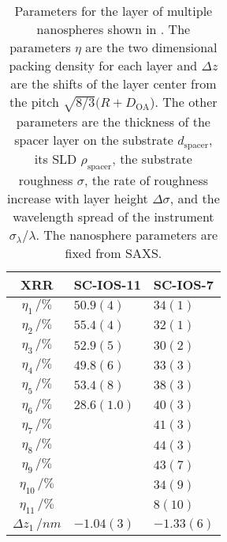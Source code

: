 \documentclass[\main/dresen_thesis.tex]{subfiles}
\begin{document}
  \begin{table}[!htbp]
    \centering
    \caption{\label{tab:looselyPackedNP:nanoparticle:xrr}Parameters for the layer of multiple nanospheres shown in . The parameters $\eta$ are the two dimensional packing density for each layer and $\Delta z$ are the shifts of the layer center from the pitch $\sqrt{8/3} (R+D_\mathrm{OA}$). The other parameters are the thickness of the spacer layer on the substrate $d_\mathrm{spacer}$, its SLD $\rho_\mathrm{spacer}$, the substrate roughness $\sigma$, the rate of roughness increase with layer height $\Delta \sigma$, and the wavelength spread of the instrument $\sigma_\lambda / \lambda$. The nanosphere parameters are fixed from SAXS.}
    \begin{tabular}{ c | l | l }
      \rule{0pt}{2ex} \textbf{XRR}  & \textbf{SC-IOS-11} & \textbf{SC-IOS-7} \\
      \hline
       $\eta_1     \, / \unit{\%}$                                  & $50.9(4)$         & $34(1)$    \\
       $\eta_2     \, / \unit{\%}$                                  & $55.4(4)$         & $32(1)$    \\
       $\eta_3     \, / \unit{\%}$                                  & $52.9(5)$         & $30(2)$    \\
       $\eta_4     \, / \unit{\%}$                                  & $49.8(6)$         & $33(3)$    \\
       $\eta_5     \, / \unit{\%}$                                  & $53.4(8)$         & $38(3)$    \\
       $\eta_6     \, / \unit{\%}$                                  & $28.6(1.0)$       & $40(3)$    \\
       $\eta_7     \, / \unit{\%}$                                  &                   & $41(3)$    \\
       $\eta_8     \, / \unit{\%}$                                  &                   & $44(3)$    \\
       $\eta_9     \, / \unit{\%}$                                  &                   & $43(7)$    \\
       $\eta_{10}     \, / \unit{\%}$                               &                   & $34(9)$    \\
       $\eta_{11}     \, / \unit{\%}$                               &                   & $8(10)$    \\
       \hline
       $\Delta z_1 \, / \unit{nm} $                                 & $-1.04(3)$        & $-1.33(6)$ \\

\end{tabular}
\end{table}
\end{document}
